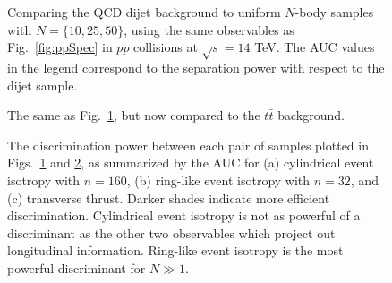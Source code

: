 \documentclass[letterpaper,11pt]{article}
\DeclareRobustCommand{\Fig}[1]{Fig.~\ref{#1}}
\DeclareRobustCommand{\Figs}[2]{Figs.~\ref{#1} and \ref{#2}}
\begin{document}
\begin{figure}[t!]
%
\centering
{}
     \hfill
     \hfill
\caption{Comparing the QCD dijet background to uniform $N$-body samples with $N = \{10,25,50\}$, using the same observables as \Fig{fig:ppSpec} in $pp$ collisions at $\sqrt{s} = 14$ TeV.
%
The AUC values in the legend correspond to the separation power with respect to the dijet sample.
}
%
\label{fig:ppRamboSpec}
\end{figure}
\begin{figure}[t!]
%
\centering
{}
     \hfill
     \hfill
\caption{The same as \Fig{fig:ppRamboSpec}, but now compared to the $t\bar{t}$ background.}
%
\label{fig:ppRamboSpecTT}
\end{figure}



\begin{figure}[t!]
%
\centering
{}
     \hfill
     \hfill
\caption{
The discrimination power between each pair of samples plotted in \Figs{fig:ppRamboSpec}{fig:ppRamboSpecTT}, as summarized by the AUC for (a) cylindrical event isotropy with $n = 160$, (b) ring-like event isotropy with $n = 32$, and (c) transverse thrust.
%
Darker shades indicate more efficient discrimination.
%
Cylindrical event isotropy is not as powerful of a discriminant as the other two observables which project out longitudinal information.
%
Ring-like event isotropy is the most powerful discriminant for $N\gg1$.
}
%
\label{fig:ppAUCtables}
\end{figure}
\end{document}
